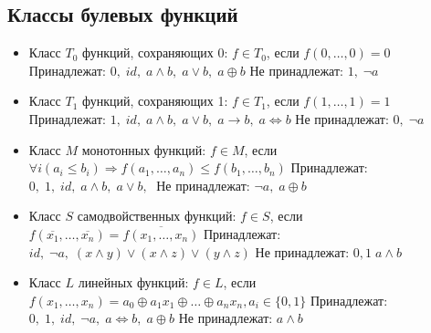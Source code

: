 \subsection{Классы булевых функций}
\begin{itemize}
    \item Класс $T_0$ функций, сохраняющих 0:
    $f \in T_{0}$, если $f(0,\dots ,0)=0$
    \newline Принадлежат: $0,\; id,\; a\land b, \; a\lor b,\; a\oplus b$ 
    \newline Не принадлежат: $1, \; \neg a$ 
    
    \item Класс $T_1$ функций, сохраняющих 1:
    $f \in T_{1}$, если $f(1,\dots ,1)=1$
    \newline Принадлежат: $1,\; id,\; a\land b,\; a\lor b,\; a\rightarrow b,\; a\Leftrightarrow b$ 
    \newline Не принадлежат: $0,\; \neg a$ 
    
    \item Класс $M$ монотонных функций:
    $f \in M$, если $\forall i(a_{i}\leqslant b_{i})\Rightarrow f(a_{1},\dots ,a_{n})\leqslant f(b_{1},\dots ,b_{n})$
    \newline Принадлежат: $0,\; 1,\; id,\; a\land b,\; a\lor b,\;$ 
    \newline Не принадлежат: $\neg a, \; a\oplus b $ 
    
    \item Класс $S$ самодвойственных функций:
    $f \in S$, если $f(\overline {x_{1}},\dots ,\overline {x_{n}})=\overline {f(x_{1},\dots ,x_{n})}$
    \newline Принадлежат: $id,\; \neg a,\; (x\land y)\lor (x\land z)\lor (y\land z)$ 
    \newline Не принадлежат: $0, 1\; a\land b $ 
    
    \item Класс $L$ линейных функций:
    $f\in L$, если $f(x_{1},\dots ,x_{n})=a_{0}\oplus a_{1}x_{1}\oplus \dots \oplus a_{n}x_{n},a_{i}\in \{0,1\}$
    \newline Принадлежат: $0,\; 1,\; id,\; \neg a,\; a\Leftrightarrow b,\; a \oplus b$ 
    \newline Не принадлежат: $a\land b $ 
    
\end{itemize}

